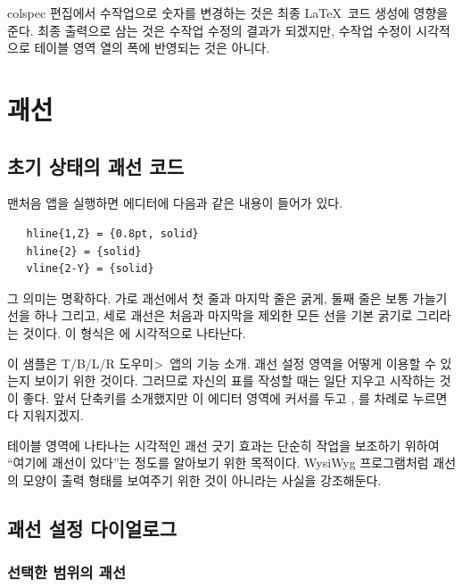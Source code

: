 \documentclass{simplman}
\newcommand*\tblrdoumi{\<3\textsf{T/B/L/R 도우미}>}
\let\opt\stopt
\newcommand*\guielem[1]{\colorbox{blue8!20}{\sffamily[#1]}}
\begin{document}
\begin{Chamgo}
\opt{manual} colspec 편집에서 수작업으로 숫자를 변경하는 것은 최종 \LaTeX\ 코드 생성에 영향을 준다. 최종 출력으로 삼는 것은 수작업 수정의 결과가 되겠지만, 수작업 수정이 시각적으로 테이블 영역 열의 폭에 반영되는 것은 아니다.
\end{Chamgo}

\chapter{괘선}

\section{초기 상태의 괘선 코드}

맨처음 앱을 실행하면 \guielem{Lines} 에디터에 다음과 같은 내용이 들어가 있다.
\begin{verbatim}
   hline{1,Z} = {0.8pt, solid}
   hline{2} = {solid}
   vline{2-Y} = {solid}
\end{verbatim}
그 의미는 명확하다. 가로 괘선에서 첫 줄과 마지막 줄은 굵게, 둘째 줄은 보통 가늘기 선을 하나 그리고, 
세로 괘선은 처음과 마지막을 제외한 모든 선을 기본 굵기로 그리라는 것이다.
이 형식은 \guielem{테이블 영역}에 시각적으로 나타난다.

이 샘플은 \tblrdoumi\ 앱의 기능 소개. 괘선 설정 영역을 어떻게 이용할 수 있는지 보이기 위한 것이다. 그러므로 자신의 표를 작성할 때는 일단 지우고 시작하는 것이 좋다. 앞서  단축키를 소개했지만 이 에디터 영역에 커서를 두고 , 를 차례로 누르면 다 지워지겠지.

테이블 영역에 나타나는 시각적인 괘선 긋기 효과는 단순히 작업을 보조하기 위하여 ``여기에 괘선이 있다''는 정도를 알아보기 위한 목적이다. WysiWyg 프로그램처럼 괘선의 모양이 출력 형태를 보여주기 위한 것이 아니라는 사실을 강조해둔다.

\section{괘선 설정 다이얼로그}

\subsection{선택한 범위의 괘선}
\end{document}
